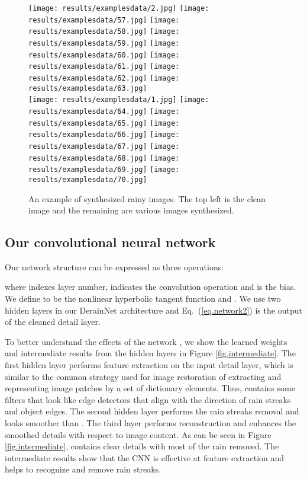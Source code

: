 \documentclass[journal]{IEEEtran}
\begin{document}
\begin{figure*}[th!]
\centering
\texttt{[image: results/examplesdata/2.jpg]}\vspace{1pt}
\texttt{[image: results/examplesdata/57.jpg]}
\texttt{[image: results/examplesdata/58.jpg]}
\texttt{[image: results/examplesdata/59.jpg]}
\texttt{[image: results/examplesdata/60.jpg]}
\texttt{[image: results/examplesdata/61.jpg]}
\texttt{[image: results/examplesdata/62.jpg]}
\texttt{[image: results/examplesdata/63.jpg]}\\
\texttt{[image: results/examplesdata/1.jpg]}
\texttt{[image: results/examplesdata/64.jpg]}
\texttt{[image: results/examplesdata/65.jpg]}
\texttt{[image: results/examplesdata/66.jpg]}
\texttt{[image: results/examplesdata/67.jpg]}
\texttt{[image: results/examplesdata/68.jpg]}
\texttt{[image: results/examplesdata/69.jpg]}
\texttt{[image: results/examplesdata/70.jpg]}
\caption{An example of synthesized rainy images. The top left is the clean image and the remaining are various images synthesized.} \label{fig.examplesdata}
\end{figure*}


\subsection{Our convolutional neural network}\label{sec.ourCNN}
Our network structure can be expressed as three operations:

where   indexes layer number,   indicates the convolution operation and  is the bias. We define  to be the nonlinear hyperbolic tangent function and . We use two hidden layers in our DerainNet architecture and Eq.\ (\ref{eq.network2}) is the output of the cleaned detail layer.




To better understand the effects of the network , we show the learned weights and intermediate results from the hidden layers in Figure \ref{fig.intermediate}. The first hidden layer performs feature extraction on the input detail layer, which is similar to the common strategy used for image restoration of extracting and representing image patches by a set of dictionary elements. Thus,   contains some filters that look like edge detectors that align with the direction of rain streaks and object edges. The second hidden layer performs the rain streaks removal and   looks smoother than  . The third layer performs reconstruction and enhances the smoothed details with respect to image content. As can be seen in Figure \ref{fig.intermediate},  contains clear details with most of the rain removed. The intermediate results show that the CNN is effective at feature extraction and 
helps to recognize and remove rain streaks.
\end{document}
